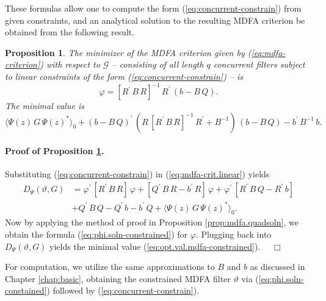 \documentclass[a4paper]{book}
\newtheorem{Proposition}{Proposition}
\begin{document}
  These formulas allow one to compute the   form (\ref{eq:concurrent-constrain}) 
   from given constraints, and
 an analytical solution to the resulting MDFA criterion 
 be obtained from the following result.

\begin{Proposition}
\label{prop:mdfa.quadsoln-constrain}
 The minimizer of the  MDFA criterion given by   (\ref{eq:mdfa-criterion})
 with respect to  $\mathcal{G}$ -- consisting of all length $q$ concurrent filters 
 subject to  linear constraints of the form (\ref{eq:concurrent-constrain}) -- is
\begin{equation}
\label{eq:phi.soln-constrained}
 \varphi =  { \left[ R^{\prime} \, B \, R \right] }^{-1} \, R^{\prime} \,
 \left( b - B \, Q \right).
\end{equation}
 The minimal value is  
\begin{equation}
\label{eq:opt.val.mdfa-constrained}
{ \langle \Psi (z) \, G \, { \Psi (z) }^* \rangle }_0 
  + {(b - B \, Q)}^{\prime} \, \left( 
  R \, { \left[ R^{\prime} \, B \, R \right] }^{-1} \, R^{\prime} 
  + B^{-1} \right) \, ( b - B \, Q) -   b^{\prime} \, B^{-1} \, b.
\end{equation}
\end{Proposition}

\paragraph{Proof of Proposition \ref{prop:mdfa.quadsoln-constrain}.}
 Substituting (\ref{eq:concurrent-constrain}) in (\ref{eq:mdfa-crit.linear}) yields
\begin{align*}
  D_{\Psi} (\vartheta, G) &  = \varphi^{\prime} \,  \left[ R^{\prime} \, B \, R \right] \,  \varphi 
  + \left[ Q^{\prime} \, B \, R - b^{\prime} \, R \right] \, \varphi + \varphi^{\prime} \,
   \left[ R^{\prime} \, B \, Q - R^{\prime} \, b \right]  \\
 & + Q^{\prime} \, B \, Q  - Q^{\prime} \, b - b^{\prime} \, Q  + { \langle \Psi (z) \, G \, { \Psi (z) }^* \rangle }_0.
\end{align*}
  Now by applying the method of proof in Proposition \ref{prop:mdfa.quadsoln}, we obtain 
  the formula (\ref{eq:phi.soln-constrained}) for $\varphi$.  Plugging back into $D_{\Psi} (\vartheta, G)$
 yields the minimal value (\ref{eq:opt.val.mdfa-constrained}).  $\quad \Box$


\vspace{.5cm}

For computation, we utilize the same approximations to $B$ and $b$ as discussed 
in  Chapter \ref{chap:basic},
 obtaining the constrained MDFA filter $\vartheta$ via (\ref{eq:phi.soln-constained})
 followed by (\ref{eq:concurrent-constrain}).
\end{document}
